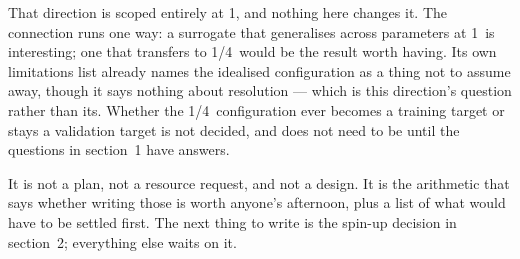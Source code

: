 That direction is scoped entirely at 1\dg, and nothing here changes it. The
connection runs one way: a surrogate that generalises across parameters at
1\dg\ is interesting; one that transfers to 1/4\dg\ would be the result worth
having. Its own limitations list already names the idealised configuration as a
thing not to assume away, though it says nothing about resolution --- which is
this direction's question rather than its. Whether the 1/4\dg\ configuration
ever becomes a training target or stays a validation target is not decided, and
does not need to be until the questions in section~1 have answers.

It is not a plan, not a resource request, and not a design. It is the arithmetic
that says whether writing those is worth anyone's afternoon, plus a list of what
would have to be settled first. The next thing to write is the spin-up decision
in section~2; everything else waits on it.
